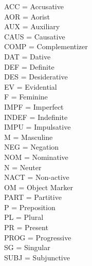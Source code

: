 \begin{front}
\noindent   ACC = Accusative \\
    AOR = Aorist \\ 
    AUX = Auxiliary  \\
    CAUS = Causative \\
    COMP = Complementizer \\
     DAT = Dative \\
	DEF = Definite \\
	DES = Desiderative \\
    EV = Evidential \\
    F = Feminine \\ 
    IMPF = Imperfect \\
      INDEF = Indefinite \\
      IMPU = Impulsative \\ 
M = Masculine \\
NEG = Negation \\
  NOM = Nominative \\
    N = Neuter \\
    NACT = Non-active \\ 
          OM = Object Marker \\
     PART = Partitive \\ 
     P = Preposition \\
     PL = Plural\\
     PR = Present \\
     PROG = Progressive \\
     SG = Singular \\
     SUBJ = Subjunctive
    



\end{front} %


%